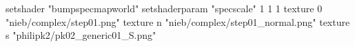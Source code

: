 setshader "bumpspecmapworld"
setshaderparam "specscale" 1 1 1
   texture 0 "nieb/complex/step01.png"
   texture n "nieb/complex/step01_normal.png"
   texture s "philipk2/pk02_generic01_S.png"